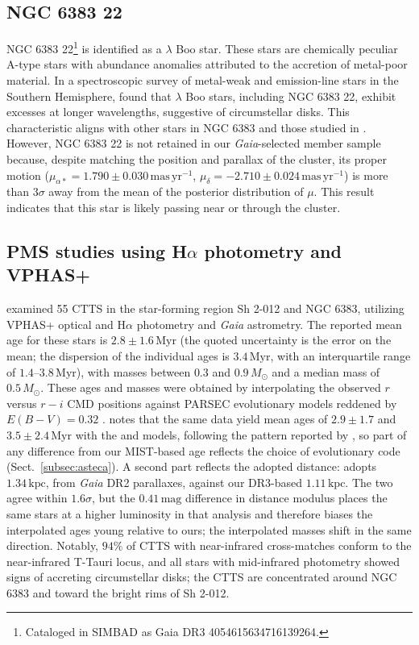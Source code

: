 \documentclass{aa}
\begin{document}
\subsection{NGC 6383 22}
NGC 6383 22\footnote{Cataloged in SIMBAD as Gaia DR3 4054615634716139264.} is identified as a $\lambda$ Boo star. These stars are chemically peculiar A-type stars with abundance anomalies attributed to the accretion of metal-poor material. In a spectroscopic survey of metal-weak and emission-line stars in the Southern Hemisphere, \citet{2020MNRAS.499.2701M} found that $\lambda$ Boo stars, including NGC 6383 22, exhibit excesses at longer wavelengths, suggestive of circumstellar disks. This characteristic aligns with other stars in NGC 6383 and those studied in \citet{2019MNRAS.484.5102K}. However, NGC 6383 22 is not retained in our \textit{Gaia}-selected member sample because, despite matching the position and parallax of the cluster, its proper motion ($\mu_{\alpha*} = 1.790 \pm 0.030\,\mathrm{mas\,yr^{-1}}$, $\mu_{\delta} = -2.710 \pm 0.024\,\mathrm{mas\,yr^{-1}}$) is more than $3\sigma$ away from the mean of the posterior distribution of $\mu$. This result indicates that this star is likely passing near or through the cluster.

\subsection{PMS studies using \texorpdfstring{H$\alpha$}{H-alpha} photometry and VPHAS+}

\citet{2019MNRAS.484.5102K} examined 55 CTTS in the star-forming region Sh 2-012 and NGC 6383, utilizing VPHAS+ optical and H$\alpha$ photometry and \textit{Gaia} astrometry. The reported mean age for these stars is $2.8 \pm 1.6\,\mathrm{Myr}$ (the quoted uncertainty is the error on the mean; the dispersion of the individual ages is $3.4\,\mathrm{Myr}$, with an interquartile range of $1.4$--$3.8\,\mathrm{Myr}$), with masses between $0.3$ and $0.9\,M_\odot$ and a median mass of $0.5\,M_\odot$. These ages and masses were obtained by interpolating the observed $r$ versus $r-i$ CMD positions against PARSEC evolutionary models reddened by $E(B-V)=0.32$ \citep{2012MNRAS.427..127B}\@. \citet{2019MNRAS.484.5102K} notes that the same data yield mean ages of $2.9\pm1.7$ and $3.5\pm2.4\,\mathrm{Myr}$ with the \citet{2011A&A...533A.109T} and \citet{2000A&A...358..593S} models, following the pattern reported by \citet{2015ApJ...808...23H}, so part of any difference from our MIST-based age reflects the choice of evolutionary code (Sect.~\ref{subsec:asteca}). A second part reflects the adopted distance: \citet{2019MNRAS.484.5102K} adopts $1.34\,\mathrm{kpc}$, from \textit{Gaia} DR2 parallaxes, against our DR3-based $1.11\,\mathrm{kpc}$. The two agree within $1.6\sigma$, but the $0.41\,\mathrm{mag}$ difference in distance modulus places the same stars at a higher luminosity in that analysis and therefore biases the interpolated ages young relative to ours; the interpolated masses shift in the same direction. Notably, $94\%$ of CTTS with near-infrared cross-matches conform to the near-infrared T-Tauri locus, and all stars with mid-infrared photometry showed signs of accreting circumstellar disks; the CTTS are concentrated around NGC 6383 and toward the bright rims of Sh 2-012.
\end{document}
